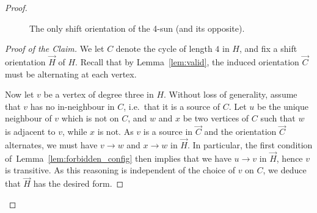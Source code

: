 \documentclass[11pt,a4aper]{article}
\newenvironment{poc}{\begin{proof}[Proof of the
    Claim]\renewcommand*{\qedsymbol}{$\blacksquare$}}{\end{proof}}
\DeclareRobustCommand*{\ora}{\overrightarrow}
\newcommand*{\orC}{\ora{C}}
\newcommand*{\orH}{\ora{H}}
\begin{document}
\begin{proof}
\begin{figure}[ht]
    \caption{The only shift orientation of the 4-sun (and its opposite).}
    \label{fig:sun_orientation}
  \end{figure}
  \begin{poc}
    We let $C$ denote the cycle of length $4$ in $H$, and 
    fix a shift orientation $\orH$ of $H$. Recall that by Lemma~\ref{lem:valid},
    the induced orientation $\orC$ must be alternating at each vertex.
  
    Now let $v$ be a vertex of degree
    three in $H$. Without loss of generality, assume that $v$ has no in-neighbour in
    $C$, i.e.\ that it is a source of $C$. Let $u$ be the unique neighbour of $v$ which is not on $C$, and $w$ and $x$ be two
    vertices of $C$ such that $w$ is adjacent to $v$, while $x$ is not. As $v$ is a source in $\orC$ and the orientation $\orC$ alternates, we must have $v\to w$ and $x\to w$ in $\orH$. In particular, the first condition of~Lemma~\ref{lem:forbidden_config} then implies that we have $u\to v$ in $\orH$, hence $v$ is transitive. As this reasoning is independent of the choice of $v$ on $C$, we deduce that $\orH$ has the desired form.
  \end{poc}



\end{proof}
\end{document}
